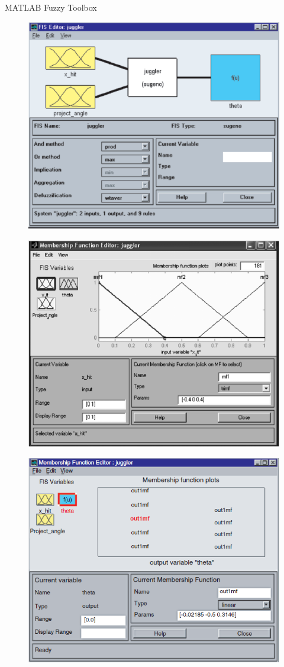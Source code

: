\documentclass[hyperref={unicode}]{beamer}
\begin{document}
\begin{frame}[allowframebreaks]{MATLAB Fuzzy Toolbox}
	\begin{figure}
	\includegraphics[width=.75\textwidth]{sw-1.png}
	\end{figure}
	\begin{figure}
	\includegraphics[width=.75\textwidth]{sw-2.png}
	\end{figure}
	\begin{figure}
	\includegraphics[width=.75\textwidth]{sw-3.png}

\end{figure}
\end{frame}
\end{document}
